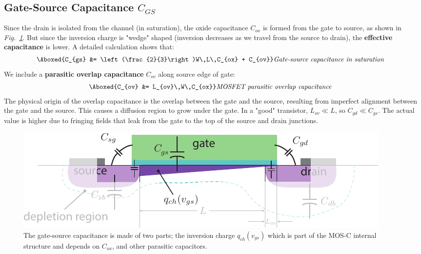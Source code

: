 \subsection{Gate-Source Capacitance \texorpdfstring{$C_{GS}$}{}}
Since the drain is isolated from the channel (in saturation), the oxide capacitance $C_{ox}$ is formed from the gate to source, as shown in \emph{Fig.~\ref{fig:mos_caps_Cgs}}.  But since the inversion charge is "wedge" shaped (inversion decreases as we travel from the source to drain), the \textbf{effective capacitance} is lower.  A detailed calculation shows that:
    \begin{align}
        \Aboxed{C_{gs} &= \left(\frac{2}{3}\right)W\,L\,C_{ox} + C_{ov}} &\textit{Gate-source capacitance in saturation}
    \end{align} 
We include a \textbf{parasitic overlap capacitance} $C_{ov}$ along source edge of gate:
    \begin{align}
        \Aboxed{C_{ov} &= L_{ov}\,W\,C_{ox}} &\textit{MOSFET parasitic overlap capacitance}
    \end{align}
The physical origin of the overlap capacitance is the overlap between the gate and the source, resulting from imperfect alignment between the gate and the source.  This causes a diffusion region to grow under the gate.   In a "good" transistor, $L_{ov} \ll L$, so $C_{gd} \ll C_{gs}$.  The actual value is higher due to fringing fields that leak from the gate to the top of the source and drain junctions.
\begin{figure}[H]
\centering
\includegraphics[width=\columnwidth]{mos_caps_Cgs}
\caption{The gate-source capacitance is made of two parts; the inversion charge $q_{ch}(v_{gs})$ which is part of the MOS-C internal structure and depends on $C_{ox}$, and other parasitic capacitors.} \label{fig:mos_caps_Cgs}
\end{figure}
\newpage
